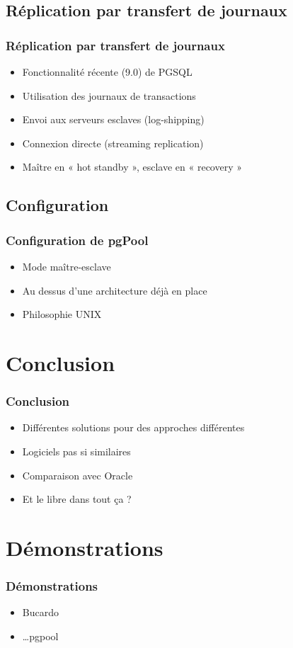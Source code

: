 \documentclass[utf8]{beamer}
\begin{document}
\subsection{Réplication par transfert de journaux} 

\begin{frame}
  \frametitle{Réplication par transfert de journaux}

  \begin{itemize}
    \item Fonctionnalité récente (9.0) de PGSQL
    \item Utilisation des journaux de transactions
    \item Envoi aux serveurs esclaves (log-shipping)
    \item Connexion directe (streaming replication)
    \item Maître en « hot standby », esclave en « recovery »
  \end{itemize}
\end{frame}

\subsection{Configuration}

\begin{frame}
  \frametitle{Configuration de pgPool}

  \begin{itemize}
    \item Mode maître-esclave
    \item Au dessus d'une architecture déjà en place
    \item Philosophie UNIX
  \end{itemize}
\end{frame}

\section{Conclusion}

\begin{frame}
  \frametitle{Conclusion}

  \begin{itemize}
    \item Différentes solutions pour des approches différentes
    \item Logiciels pas si similaires
    \item Comparaison avec Oracle
    \item Et le libre dans tout ça ?
  \end{itemize}
\end{frame}

\section{Démonstrations}

\begin{frame}
  \frametitle{Démonstrations}

  \begin{itemize}
    \item Bucardo
    \item …pgpool
  \end{itemize}
\end{frame}
\end{document}
